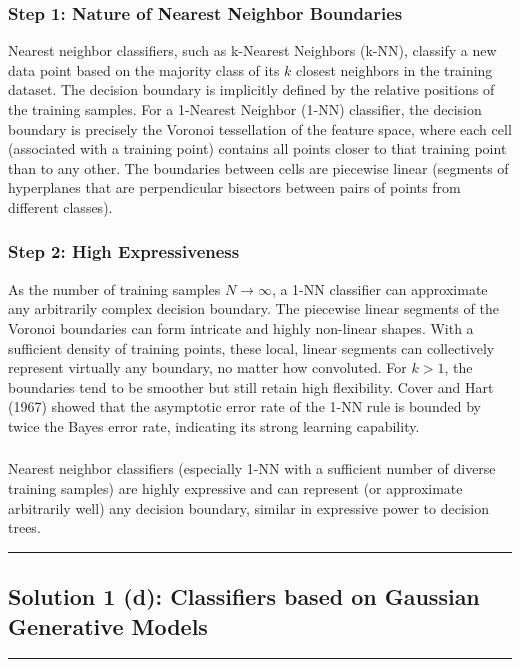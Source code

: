 \documentclass{article}
\begin{document}
\subsubsection*{Step 1: Nature of Nearest Neighbor Boundaries}
\parbox{\textwidth}{
Nearest neighbor classifiers, such as k-Nearest Neighbors (k-NN), classify a new data point based on the majority class of its $k$ closest neighbors in the training dataset. The decision boundary is implicitly defined by the relative positions of the training samples. For a 1-Nearest Neighbor (1-NN) classifier, the decision boundary is precisely the Voronoi tessellation of the feature space, where each cell (associated with a training point) contains all points closer to that training point than to any other. The boundaries between cells are piecewise linear (segments of hyperplanes that are perpendicular bisectors between pairs of points from different classes).
}

\subsubsection*{Step 2: High Expressiveness}
\parbox{\textwidth}{
As the number of training samples $N \to \infty$, a 1-NN classifier can approximate any arbitrarily complex decision boundary. The piecewise linear segments of the Voronoi boundaries can form intricate and highly non-linear shapes. With a sufficient density of training points, these local, linear segments can collectively represent virtually any boundary, no matter how convoluted. For $k > 1$, the boundaries tend to be smoother but still retain high flexibility. Cover and Hart (1967) showed that the asymptotic error rate of the 1-NN rule is bounded by twice the Bayes error rate, indicating its strong learning capability.
}

\subsubsection*{}
\parbox{\textwidth}{
Nearest neighbor classifiers (especially 1-NN with a sufficient number of diverse training samples) are highly expressive and can represent (or approximate arbitrarily well) any decision boundary, similar in expressive power to decision trees.
}

\noindent\rule{\textwidth}{0.4pt}

\newpage

\subsection*{Solution 1 (d): Classifiers based on Gaussian Generative Models}
\noindent\rule{\textwidth}{0.4pt}
\end{document}
